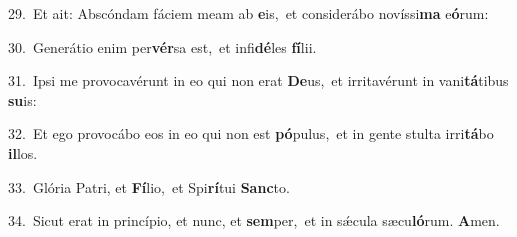 {\numbfont\textcolor{\numbcolor}{29.}}~Et ait: Abscóndam fáciem meam ab \textbf{e}\-is,~\star et considerábo novíssi\textbf{ma} e\-\textbf{ó}\-rum:\par
{\numbfont\textcolor{\numbcolor}{30.}}~Generátio enim per\-\textbf{vér}\-sa est,~\star et infi\-\textbf{dé}\-les \textbf{fí}\-lii.\par
{\numbfont\textcolor{\numbcolor}{31.}}~Ipsi me provocavérunt in eo qui non erat \textbf{De}\-us,~\star et irritavérunt in vani\-\textbf{tá}\-tibus \textbf{su}\-is:\par
{\numbfont\textcolor{\numbcolor}{32.}}~Et ego provocábo eos in eo qui non est \textbf{pó}\-pulus,~\star et in gente stulta irri\-\textbf{tá}\-bo \textbf{il}\-los.\par
{\numbfont\textcolor{\numbcolor}{33.}}~Glória Patri, et \textbf{Fí}\-lio,~\star et Spi\-\textbf{rí}\-tui \textbf{Sanc}\-to.\par
{\numbfont\textcolor{\numbcolor}{34.}}~Sicut erat in princípio, et nunc, et \textbf{sem}\-per,~\star et in sǽcula sæcu\-\textbf{ló}\-rum. \textbf{A}\-men.\par
